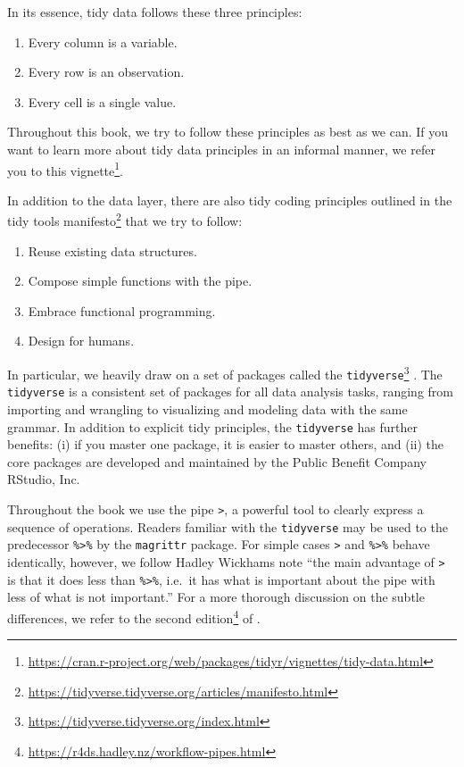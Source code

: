 \documentclass[
]{krantz}
\providecommand{\tightlist}{%
  \setlength{\itemsep}{0pt}\setlength{\parskip}{0pt}}
\renewcommand{\href}[2]{#2\footnote{\url{#1}}}
\begin{document}
In its essence, tidy data follows these three principles:

\begin{enumerate}
\def\labelenumi{\arabic{enumi}.}
\tightlist
\item
  Every column is a variable.
\item
  Every row is an observation.
\item
  Every cell is a single value.
\end{enumerate}

Throughout this book, we try to follow these principles as best as we can. If you want to learn more about tidy data principles in an informal manner, we refer you to \href{https://cran.r-project.org/web/packages/tidyr/vignettes/tidy-data.html}{this vignette}.

In addition to the data layer, there are also tidy coding principles outlined in \href{https://tidyverse.tidyverse.org/articles/manifesto.html}{the tidy tools manifesto} that we try to follow:

\begin{enumerate}
\def\labelenumi{\arabic{enumi}.}
\tightlist
\item
  Reuse existing data structures.
\item
  Compose simple functions with the pipe.
\item
  Embrace functional programming.
\item
  Design for humans.
\end{enumerate}

In particular, we heavily draw on a set of packages called the \href{https://tidyverse.tidyverse.org/index.html}{\texttt{tidyverse}} \citep{Wickham2019}. The \texttt{tidyverse} is a consistent set of packages for all data analysis tasks, ranging from importing and wrangling to visualizing and modeling data with the same grammar. In addition to explicit tidy principles, the \texttt{tidyverse} has further benefits: (i) if you master one package, it is easier to master others, and (ii) the core packages are developed and maintained by the Public Benefit Company RStudio, Inc.~

Throughout the book we use the pipe \texttt{\textbar{}\textgreater{}}, a powerful tool to clearly express a sequence of operations. Readers familiar with the \texttt{tidyverse} may be used to the predecessor \texttt{\%\textgreater{}\%} by the \texttt{magrittr} package. For simple cases \texttt{\textbar{}\textgreater{}} and \texttt{\%\textgreater{}\%} behave identically, however, we follow Hadley Wickhams note ``the main advantage of \texttt{\textbar{}\textgreater{}} is that it does less than \texttt{\%\textgreater{}\%}, i.e.~it has what is important about the pipe with less of what is not important.'' For a more thorough discussion on the subtle differences, we refer to the \href{https://r4ds.hadley.nz/workflow-pipes.html}{second edition} of \citet{Wickham2016}.
\end{document}
